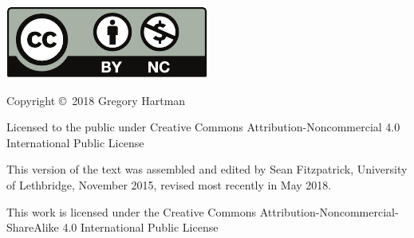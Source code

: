 \noindent\hskip -1in\begin{minipage}{2in}
\includegraphics{text/by-nc} 
\end{minipage}
\begin{minipage}{3in}
\noindent Copyright \copyright\ 2018 Gregory Hartman

Licensed to the public under Creative Commons Attribution-Noncommercial 4.0 International Public License
\end{minipage}

\bigskip

\bigskip



\bigskip

\begin{minipage}{3.3in}
This version of the text was assembled and edited by Sean Fitzpatrick, University of Lethbridge, November 2015, revised most recently in May 2018. 

This work is licensed under the Creative Commons Attribution-Noncommercial-ShareAlike 4.0 International Public License
\end{minipage}
